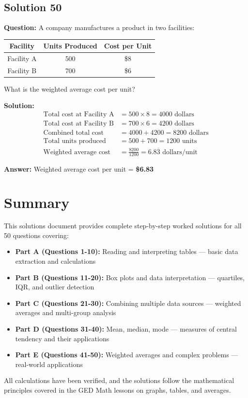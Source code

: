 \documentclass[12pt,a4paper]{article}
\begin{document}
\subsection*{Solution 50}
\textbf{Question:} A company manufactures a product in two facilities:
\begin{center}
\begin{tabular}{|c|c|c|}
\hline
Facility & Units Produced & Cost per Unit \\
\hline
Facility A & 500 & \$8 \\
Facility B & 700 & \$6 \\
\hline
\end{tabular}
\end{center}
What is the weighted average cost per unit?

\textbf{Solution:}
\begin{align*}
\text{Total cost at Facility A} &= 500 \times 8 = 4000 \text{ dollars} \\
\text{Total cost at Facility B} &= 700 \times 6 = 4200 \text{ dollars} \\
\text{Combined total cost} &= 4000 + 4200 = 8200 \text{ dollars} \\
\text{Total units produced} &= 500 + 700 = 1200 \text{ units} \\
\text{Weighted average cost} &= \frac{8200}{1200} = 6.8\overline{3} \text{ dollars/unit}
\end{align*}

\textbf{Answer:} Weighted average cost per unit = \textbf{\$6.83}

\newpage

\section{Summary}

This solutions document provides complete step-by-step worked solutions for all 50 questions covering:

\begin{itemize}
    \item \textbf{Part A (Questions 1-10):} Reading and interpreting tables — basic data extraction and calculations
    \item \textbf{Part B (Questions 11-20):} Box plots and data interpretation — quartiles, IQR, and outlier detection
    \item \textbf{Part C (Questions 21-30):} Combining multiple data sources — weighted averages and multi-group analysis
    \item \textbf{Part D (Questions 31-40):} Mean, median, mode — measures of central tendency and their applications
    \item \textbf{Part E (Questions 41-50):} Weighted averages and complex problems — real-world applications
\end{itemize}

All calculations have been verified, and the solutions follow the mathematical principles covered in the GED Math lessons on graphs, tables, and averages.
\end{document}
